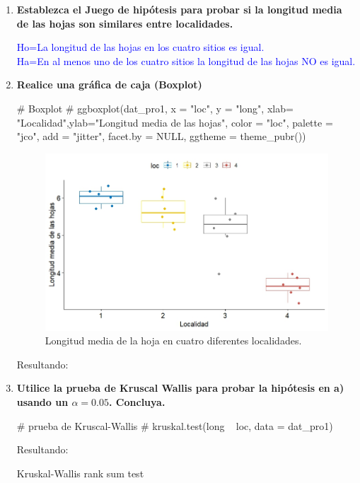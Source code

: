 \documentclass[a4paper,12pt]{article}
\begin{document}
	\begin{enumerate} [label=\textbf{\alph*})]
\item {\textbf{Establezca el Juego de hipótesis para probar si la longitud media de las hojas son similares entre localidades.}} 
		\begin{center}
			\textcolor{blue}
				{	
				Ho=La longitud de las hojas en los cuatro sitios es igual.\\
				Ha=En al menos uno de los cuatro sitios la longitud de las hojas NO es igual.
				}
		\end{center}
\item {\textbf{Realice una gráfica de caja (Boxplot)}} 	
\begin{MyVerbatim}
# Boxplot #
ggboxplot(dat_pro1, x = "loc", y = "long",
xlab= "Localidad",ylab="Longitud media de las hojas", 
color = "loc", palette = "jco",
add = "jitter", facet.by = NULL, ggtheme = theme_pubr())
	\end{MyVerbatim}
\begin{figure}[H]
	\centering
	\includegraphics[width=0.7\linewidth]{Box_prob1}
	\caption[prob1_box1]{Longitud media de la hoja en cuatro diferentes localidades.}
	\label{fig:boxprob1}
\end{figure}
Resultando:\\
\item {\textbf{Utilice la prueba de Kruscal Wallis para probar la hipótesis en a) usando un \( \alpha = 0.05 \). Concluya.}}\\
	
	\begin{MyVerbatim}
# prueba de Kruscal-Wallis #
kruskal.test(long ~ loc, data = dat_pro1)
	\end{MyVerbatim}
Resultando:
\begin{MyVerbatim}
	Kruskal-Wallis rank sum test


\end{MyVerbatim}
\end{enumerate}
\end{document}
